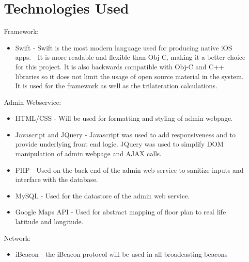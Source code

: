 \chapter{Technologies Used}

Framework:

\begin{itemize}
\item Swift - Swift is the most modern language used for producing native iOS apps.  It is more readable and flexible than Obj-C, making it a better choice for this project. It is also backwards compatible with Obj-C and C++ libraries so it does not limit the usage of open source material in the system. It is used for the framework as well as the trilateration calculations.
\end{itemize}

Admin Webservice:

\begin{itemize}
\item HTML/CSS - Will be used for formatting and styling of admin webpage.
\item Javascript and JQuery - Javascript was used to add responsiveness and to provide underlying front end logic. JQuery was used to simplify DOM manipulation of admin webpage and AJAX calls.
\item PHP - Used on the back end of the admin web service to sanitize inputs and interface with the database.
\item MySQL - Used for the datastore of the admin web service.
\item Google Maps API - Used for abstract mapping of floor plan to real life latitude and longitude.
\end{itemize}

Network:
\begin{itemize}
\item iBeacon - the iBeacon protocol will be used in all broadcasting beacons
\end{itemize}
